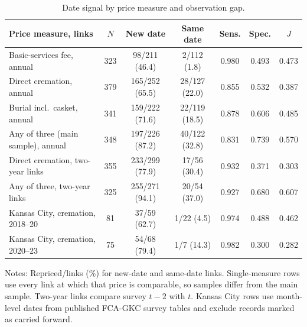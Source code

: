 \begin{table}[H]\centering\footnotesize
\caption{Date signal by price measure and observation gap.}\label{tab:A1}
\setlength{\tabcolsep}{2.5pt}\scriptsize
\begin{tabular*}{\textwidth}{@{\extracolsep{\fill}}p{4.6cm}cccccc@{}}\toprule
Price measure, links & $N$ & New date & Same date & Sens. & Spec. & $J$ \\\midrule
Basic-services fee, annual & 323 & 98/211 (46.4) & 2/112 (1.8) & 0.980 & 0.493 & 0.473 \\
Direct cremation, annual & 379 & 165/252 (65.5) & 28/127 (22.0) & 0.855 & 0.532 & 0.387 \\
Burial incl.~casket, annual & 341 & 159/222 (71.6) & 22/119 (18.5) & 0.878 & 0.606 & 0.485 \\
Any of three (main sample), annual & 348 & 197/226 (87.2) & 40/122 (32.8) & 0.831 & 0.739 & 0.570 \\
Direct cremation, two-year links & 355 & 233/299 (77.9) & 17/56 (30.4) & 0.932 & 0.371 & 0.303 \\
Any of three, two-year links & 325 & 255/271 (94.1) & 20/54 (37.0) & 0.927 & 0.680 & 0.607 \\
Kansas City, cremation, 2018--20 & 81 & 37/59 (62.7) & 1/22 (4.5) & 0.974 & 0.488 & 0.462 \\
Kansas City, cremation, 2020--23 & 75 & 54/68 (79.4) & 1/7 (14.3) & 0.982 & 0.300 & 0.282 \\
\bottomrule\end{tabular*}
\begin{minipage}{\textwidth}\vspace{3pt}\scriptsize Notes: Repriced/links (\%) for new-date and same-date links. Single-measure rows use every link at which that price is comparable, so samples differ from the main sample. Two-year links compare survey $t-2$ with $t$. Kansas City rows use month-level dates from published FCA-GKC survey tables and exclude records marked as carried forward.\end{minipage}
\end{table}
